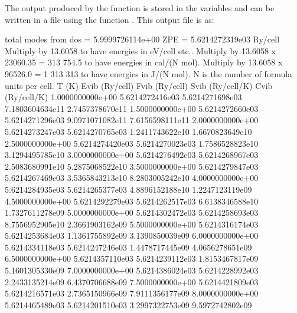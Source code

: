 \documentclass[letterpaper,10pt,english]{sphinxmanual}
\begin{document}
The output produced by the function  is stored in the variables  and can be written in a file using the function . This output file is as:

\begin{sphinxVerbatim}[commandchars=\\\{\}]
\PYGZsh{} total modes from dos = 5.9999726114e+00
\PYGZsh{} ZPE = 5.6214272319e\PYGZhy{}03 Ry/cell
\PYGZsh{} Multiply by 13.6058 to have energies in eV/cell etc..
\PYGZsh{} Multiply by 13.6058 x 23060.35 = 313 754.5 to have energies in cal/(N mol).
\PYGZsh{} Multiply by 13.6058 x 96526.0 = 1 313 313 to have energies in J/(N mol).
\PYGZsh{} N is the number of formula units per cell.
\PYGZsh{}
\PYGZsh{} T (K) 	Evib (Ry/cell)	Fvib (Ry/cell)	Svib (Ry/cell/K)	Cvib (Ry/cell/K)
1.0000000000e+00	5.6214272416e\PYGZhy{}03	5.6214271698e\PYGZhy{}03	7.1803604634e\PYGZhy{}11	2.7457378670e\PYGZhy{}11
1.5000000000e+00	5.6214272660e\PYGZhy{}03	5.6214271296e\PYGZhy{}03	9.0971071082e\PYGZhy{}11	7.6156598111e\PYGZhy{}11
2.0000000000e+00	5.6214273247e\PYGZhy{}03	5.6214270765e\PYGZhy{}03	1.2411743622e\PYGZhy{}10	1.6670823649e\PYGZhy{}10
2.5000000000e+00	5.6214274420e\PYGZhy{}03	5.6214270023e\PYGZhy{}03	1.7586528823e\PYGZhy{}10	3.1294495785e\PYGZhy{}10
3.0000000000e+00	5.6214276492e\PYGZhy{}03	5.6214268967e\PYGZhy{}03	2.5083680991e\PYGZhy{}10	5.2875068522e\PYGZhy{}10
3.5000000000e+00	5.6214279847e\PYGZhy{}03	5.6214267469e\PYGZhy{}03	3.5365843213e\PYGZhy{}10	8.2803005242e\PYGZhy{}10
4.0000000000e+00	5.6214284935e\PYGZhy{}03	5.6214265377e\PYGZhy{}03	4.8896152188e\PYGZhy{}10	1.2247123119e\PYGZhy{}09
4.5000000000e+00	5.6214292279e\PYGZhy{}03	5.6214262517e\PYGZhy{}03	6.6138346588e\PYGZhy{}10	1.7327611278e\PYGZhy{}09
5.0000000000e+00	5.6214302472e\PYGZhy{}03	5.6214258693e\PYGZhy{}03	8.7556952905e\PYGZhy{}10	2.3661903162e\PYGZhy{}09
5.5000000000e+00	5.6214316174e\PYGZhy{}03	5.6214253684e\PYGZhy{}03	1.1361755892e\PYGZhy{}09	3.1390850039e\PYGZhy{}09
6.0000000000e+00	5.6214334118e\PYGZhy{}03	5.6214247246e\PYGZhy{}03	1.4478717445e\PYGZhy{}09	4.0656278651e\PYGZhy{}09
6.5000000000e+00	5.6214357110e\PYGZhy{}03	5.6214239112e\PYGZhy{}03	1.8153467817e\PYGZhy{}09	5.1601305330e\PYGZhy{}09
7.0000000000e+00	5.6214386024e\PYGZhy{}03	5.6214228992e\PYGZhy{}03	2.2433135214e\PYGZhy{}09	6.4370706688e\PYGZhy{}09
7.5000000000e+00	5.6214421809e\PYGZhy{}03	5.6214216571e\PYGZhy{}03	2.7365150966e\PYGZhy{}09	7.9111356177e\PYGZhy{}09
8.0000000000e+00	5.6214465489e\PYGZhy{}03	5.6214201510e\PYGZhy{}03	3.2997322753e\PYGZhy{}09	9.5972742802e\PYGZhy{}09

\end{sphinxVerbatim}
\end{document}
